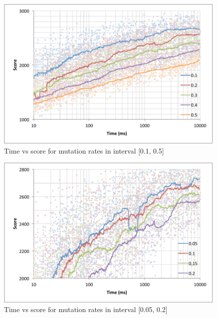 \documentclass[a4paper]{proc}
\begin{document}
\begin{figure}
  \includegraphics[width=\linewidth]{mutation_rate_1.pdf}
  \caption{Time vs score for mutation rates in interval [0.1, 0.5]}
  \label{fig:mutation_rate_1}
\end{figure}

\begin{figure}
  \includegraphics[width=\linewidth]{mutation_rate_2.pdf}
  \caption{Time vs score for mutation rates in interval [0.05, 0.2]}
  \label{fig:mutation_rate_2}
\end{figure}
\end{document}
